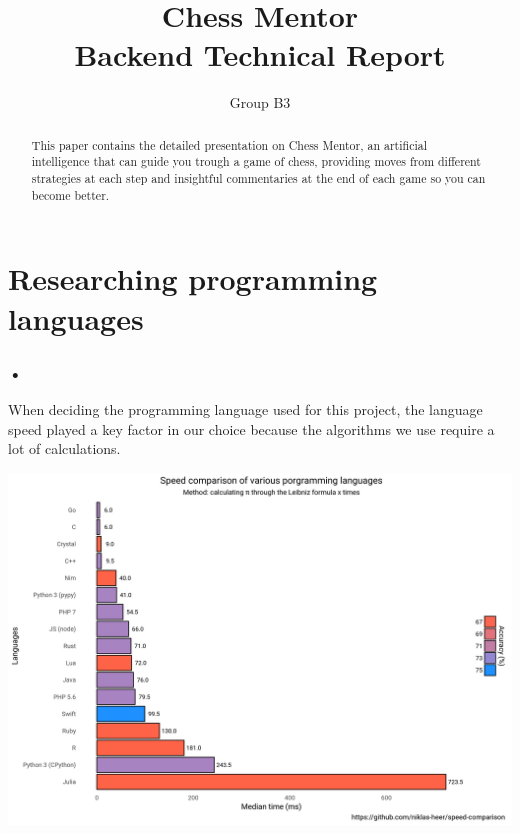 \documentclass{svproc}
\begin{document}
\mainmatter

\title{
Chess Mentor \\
Backend Technical Report} 
\author{Group B3}


\maketitle

\begin{abstract}
This paper contains the detailed presentation on Chess Mentor, an artificial intelligence that can guide you trough a game of chess, providing moves from different strategies at each step and insightful commentaries at the end of each game so you can become better.
\end{abstract}

\section{Researching programming languages}

\subsubsection{•}
When deciding the programming language used for this project, the language speed played a key factor in our choice because the algorithms we use require a lot of calculations.

\includegraphics[scale=0.5]{programming-languages-speed}
\end{document}

